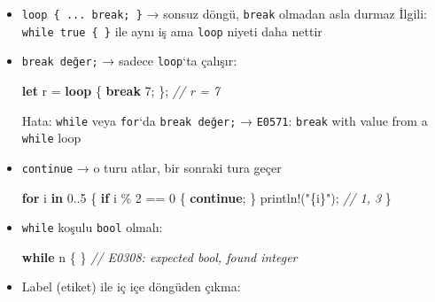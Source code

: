 \documentclass[12pt,a4paper]{article}
\newenvironment{Shaded}{}{}
\newcommand{\CommentTok}[1]{\textcolor[rgb]{0.38,0.63,0.69}{\textit{#1}}}
\newcommand{\ControlFlowTok}[1]{\textcolor[rgb]{0.00,0.44,0.13}{\textbf{#1}}}
\newcommand{\DecValTok}[1]{\textcolor[rgb]{0.25,0.63,0.44}{#1}}
\newcommand{\KeywordTok}[1]{\textcolor[rgb]{0.00,0.44,0.13}{\textbf{#1}}}
\newcommand{\NormalTok}[1]{#1}
\newcommand{\OperatorTok}[1]{\textcolor[rgb]{0.40,0.40,0.40}{#1}}
\newcommand{\StringTok}[1]{\textcolor[rgb]{0.25,0.44,0.63}{#1}}
\begin{document}
\begin{itemize}
\item
  \texttt{loop\ \{\ ...\ break;\ \}} → sonsuz döngü, \texttt{break} olmadan asla durmaz
  İlgili: \texttt{while\ true\ \{\ \}} ile aynı iş ama \texttt{loop} niyeti daha nettir
\item
  \texttt{break\ değer;} → sadece \texttt{loop}`ta çalışır:

\begin{Shaded}
\begin{Highlighting}[]
\KeywordTok{let}\NormalTok{ r }\OperatorTok{=} \ControlFlowTok{loop} \OperatorTok{\{} \ControlFlowTok{break} \DecValTok{7}\OperatorTok{;} \OperatorTok{\};}   \CommentTok{// r = 7}
\end{Highlighting}
\end{Shaded}


  Hata: \texttt{while} veya \texttt{for}`da \texttt{break\ değer;} → \texttt{E0571}: \texttt{break} with value from a \texttt{while} loop
\item
  \texttt{continue} → o turu atlar, bir sonraki tura geçer

\begin{Shaded}
\begin{Highlighting}[]
\ControlFlowTok{for}\NormalTok{ i }\KeywordTok{in} \DecValTok{0}\OperatorTok{..}\DecValTok{5} \OperatorTok{\{}
    \ControlFlowTok{if}\NormalTok{ i }\OperatorTok{\%} \DecValTok{2} \OperatorTok{==} \DecValTok{0} \OperatorTok{\{} \ControlFlowTok{continue}\OperatorTok{;} \OperatorTok{\}}
\NormalTok{    println}\OperatorTok{!(}\StringTok{"\{i\}"}\OperatorTok{);}   \CommentTok{// 1, 3}
\OperatorTok{\}}
\end{Highlighting}
\end{Shaded}
\item
  \texttt{while} koşulu \texttt{bool} olmalı:

\begin{Shaded}
\begin{Highlighting}[]
\ControlFlowTok{while}\NormalTok{ n }\OperatorTok{\{} \OperatorTok{\}}   \CommentTok{// E0308: expected bool, found integer}
\end{Highlighting}
\end{Shaded}
\item
  Label (etiket) ile iç içe döngüden çıkma:


\end{itemize}
\end{document}
